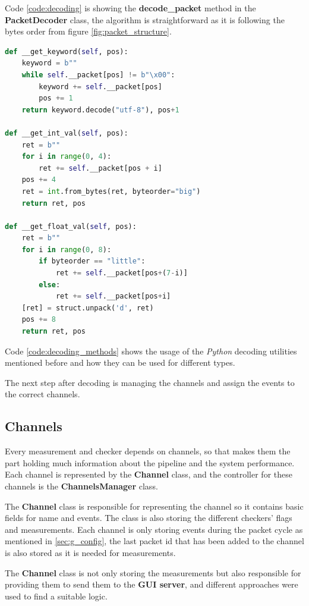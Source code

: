 Code \ref{code:decoding} is showing the \textbf{decode\_packet} method in the \textbf{PacketDecoder}
class, the algorithm is straightforward as it is following the bytes order from figure \ref{fig:packet_structure}.
\newline
\begin{lstlisting}[language=Python, label=code:decoding_methods, caption={Helper methods in decoding},captionpos=b]
def __get_keyword(self, pos):
	keyword = b""
	while self.__packet[pos] != b"\x00":
		keyword += self.__packet[pos]
		pos += 1
	return keyword.decode("utf-8"), pos+1

def __get_int_val(self, pos):
	ret = b""
	for i in range(0, 4):
		ret += self.__packet[pos + i]
	pos += 4
	ret = int.from_bytes(ret, byteorder="big")
	return ret, pos

def __get_float_val(self, pos):
	ret = b""
	for i in range(0, 8):
		if byteorder == "little":
			ret += self.__packet[pos+(7-i)]
		else:
			ret += self.__packet[pos+i]
	[ret] = struct.unpack('d', ret)
	pos += 8
	return ret, pos
\end{lstlisting}

Code \ref{code:decoding_methods} shows the usage of the \textit{Python} decoding utilities mentioned before
and how they can be used for different types.

The next step after decoding is managing the channels and assign the events to the correct channels.

\subsection{Channels}
Every measurement and checker depends on channels, so that makes them the part holding much information
about the pipeline and the system performance. Each channel is represented by the \textbf{Channel} class,
and the controller for these channels is the \textbf{ChannelsManager} class.

The \textbf{Channel} class is responsible for representing the channel so it contains basic fields 
for name and events. The class is also storing the different checkers' flags and measurements. Each channel
is only storing events during the packet cycle as mentioned in \ref{sec:g_config}, the last packet id that
has been added to the channel is also stored as it is needed for measurements.

The \textbf{Channel} class is not only storing the measurements but also responsible for providing them
to send them to the \textbf{GUI server}, and different approaches were used to find a suitable logic.

